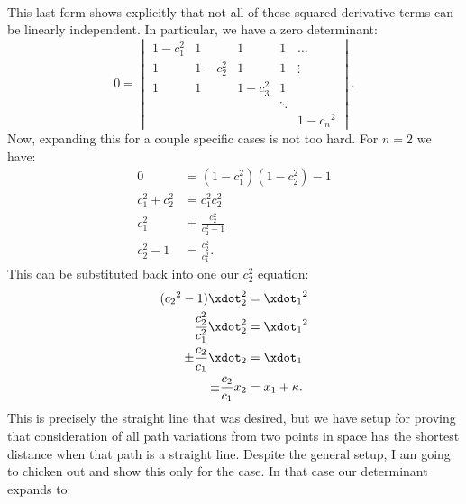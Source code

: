 {\begin{equation}
\begin{aligned}
\end{aligned}
\end{equation}
%
This last form shows explicitly that not all of these squared derivative terms can be linearly independent.  In particular, we have a
zero determinant:
%
\begin{equation}\label{eqn:goldsteinCh12:1220}
0 =
\begin{vmatrix}
1 - c_1^2   & 1            & 1         & 1 & \hdots \\
1           & 1 - c_2^2    & 1         & 1 & \vdots \\
1           & 1            & 1 - c_3^2 & 1 & \\
            &              &           & \ddots & \\
            &              &           &        & 1 - {c_n}^2
\end{vmatrix}.
\end{equation}
%
Now, expanding this for a couple specific cases is not too hard.  For \(n=2\) we have:
%
\begin{equation}\label{eqn:goldsteinCh12:700}
\begin{aligned}
0 &= (1 - c_1^2)(1-c_2^2) - 1 \\
c_1^2 + c_2^2 &= c_1^2 c_2^2 \\
c_1^2 &= \frac{c_2^2}{ c_2^2 - 1 } \\
c_2^2 - 1 &= \frac{c_2^2}{ c_1^2 }.
\end{aligned}
\end{equation}
%
This can be substituted back into one our \(c_2^2\) equation:
%
\begin{equation}\label{eqn:goldsteinCh12:720}
\begin{aligned}
({c_2}^2 -1)\xdot_2^2 &= {\xdot_1}^2 \\
\frac{c_2^2}{ c_1^2 } \xdot_2^2 &= {\xdot_1}^2 \\
\pm \frac{c_2}{ c_1 } \xdot_2 &= {\xdot_1} \\
\pm \frac{c_2}{ c_1 } x_2 &= x_1 + \kappa .
\end{aligned}
\end{equation}
%
This is precisely the straight line that was desired, but we have setup for proving that consideration of all path variations from two points
in  space has the shortest distance when that path is a straight line.
%
Despite the general setup, I am going to chicken out and show this only for the  case.  In that case our determinant expands to:
%
\begin{equation}\label{eqn:goldsteinCh12:1240}

\end{equation}}

